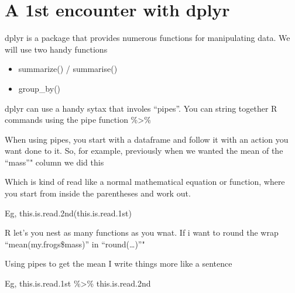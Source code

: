 \documentclass[]{book}
\newenvironment{Shaded}{\begin{snugshade}}{\end{snugshade}}
\newcommand{\KeywordTok}[1]{\textcolor[rgb]{0.13,0.29,0.53}{\textbf{#1}}}
\newcommand{\StringTok}[1]{\textcolor[rgb]{0.31,0.60,0.02}{#1}}
\newcommand{\CommentTok}[1]{\textcolor[rgb]{0.56,0.35,0.01}{\textit{#1}}}
\newcommand{\OperatorTok}[1]{\textcolor[rgb]{0.81,0.36,0.00}{\textbf{#1}}}
\newcommand{\NormalTok}[1]{#1}
\providecommand{\tightlist}{%
  \setlength{\itemsep}{0pt}\setlength{\parskip}{0pt}}
\theoremstyle{definition}
\theoremstyle{definition}
\theoremstyle{definition}
\theoremstyle{remark}
\begin{document}
\section{A 1st encounter with dplyr}\label{a-1st-encounter-with-dplyr}

dplyr is a package that provides numerous functions for manipulating
data. We will use two handy functions

\begin{itemize}
\tightlist
\item
  summarize() / summarise()
\item
  group\_by()
\end{itemize}

dplyr can use a handy sytax that involes ``pipes''. You can string
together R commands using the pipe function \%\textgreater{}\%

When using pipes, you start with a dataframe and follow it with an
action you want done to it. So, for example, previously when we wanted
the mean of the ``mass''" column we did this

\begin{Shaded}
\end{Shaded}

Which is kind of read like a normal mathematical equation or function,
where you start from inside the parentheses and work out.

Eg, this.is.read.2nd(this.is.read.1st)

R let's you nest as many functions as you wnat. If i want to round the
wrap ``mean(my.frogs\$mass)'' in ``round(\ldots{})''"

\begin{Shaded}
\end{Shaded}

Using pipes to get the mean I write things more like a sentence

Eg, this.is.read.1st \%\textgreater{}\% this.is.read.2nd

\begin{Shaded}
\end{Shaded}
\end{document}
